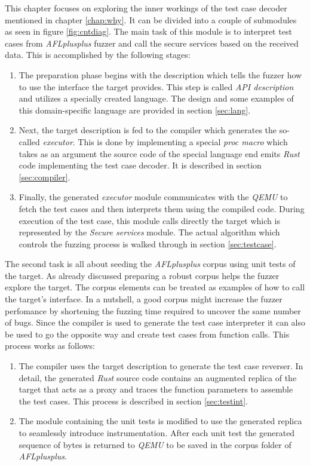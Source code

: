 This chapter focuses on exploring the inner workings of the test case decoder mentioned in chapter \ref{chap:why}. It can be divided into a couple of submodules as seen in figure \ref{fig:cntdiag}. The main task of this module is to interpret test cases from \textit{AFLplusplus} fuzzer and call the secure services based on the received data. This is accomplished by the following stages:
\begin{enumerate}
    \item The preparation phase begins with the description which tells the fuzzer how to use the interface the target provides. This step is called \textit{API description} and utilizes a specially created language. The design and some examples of this domain-specific language are provided in section \ref{sec:lang}.
    \item Next, the target description is fed to the compiler which generates the so-called \textit{executor}. This is done by implementing a special \textit{proc macro} which takes as an argument the source code of the special language end emits \textit{Rust} code implementing the test case decoder. It is described in section \ref{sec:compiler}.
    \item Finally, the generated \textit{executor} module communicates with the \textit{QEMU} to fetch the test cases and then interprets them using the compiled code. During execution of the test case, this module calls directly the target which is represented by the \textit{Secure services} module. The actual algorithm which controls the fuzzing process is walked through in section \ref{sec:testcase}.
\end{enumerate}
The second task is all about seeding the \textit{AFLplusplus} corpus using unit tests of the target. As already discussed preparing a robust corpus helps the fuzzer explore the target. The corpus elements can be treated as examples of how to call the target's interface. In a nutshell, a good corpus might increase the fuzzer perfomance by shortening the fuzzing time required to uncover the same number of bugs. Since the compiler is used to generate the test case interpreter it can also be used to go the opposite way and create test cases from function calls. This process works as follows:
\begin{enumerate}
    \item The compiler uses the target description to generate the test case reverser. In detail, the generated \textit{Rust} source code contains an augmented replica of the target that acts as a proxy and traces the function parameters to assemble the test cases. This process is described in section \ref{sec:testint}.
    \item The module containing the unit tests is modified to use the generated replica to seamlessly introduce instrumentation. After each unit test the generated sequence of bytes is returned to \textit{QEMU} to be saved in the corpus folder of \textit{AFLplusplus}.
\end{enumerate}
